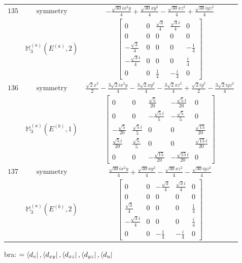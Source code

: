 \documentclass[fleqn,8pt,landscape]{jsarticle}
\begin{document}
\begin{longtable}{ccc}
$ 135 $ & $ \text{symmetry} $ & $ - \frac{\sqrt{30} i x^{2} y}{4} + \frac{\sqrt{30} x y^{2}}{4} - \frac{\sqrt{30} x z^{2}}{4} + \frac{\sqrt{30} i y z^{2}}{4} $ \\
$  $ & $ \mathbb{M}_{3}^{(a)}(E^{(a)},2) $ & $ \begin{bmatrix} 0 & 0 & \frac{\sqrt{3}}{4} & \frac{\sqrt{3} i}{4} & 0 \\ 0 & 0 & 0 & 0 & 0 \\ - \frac{\sqrt{3}}{4} & 0 & 0 & 0 & - \frac{1}{4} \\ - \frac{\sqrt{3} i}{4} & 0 & 0 & 0 & \frac{i}{4} \\ 0 & 0 & \frac{1}{4} & - \frac{i}{4} & 0 \end{bmatrix} $ \\ \hline
$ 136 $ & $ \text{symmetry} $ & $ \frac{\sqrt{2} x^{3}}{2} - \frac{3 \sqrt{2} i x^{2} y}{4} - \frac{3 \sqrt{2} x y^{2}}{4} - \frac{3 \sqrt{2} x z^{2}}{4} + \frac{\sqrt{2} i y^{3}}{2} - \frac{3 \sqrt{2} i y z^{2}}{4} $ \\
$  $ & $ \mathbb{M}_{3}^{(a)}(E^{(b)},1) $ & $ \begin{bmatrix} 0 & 0 & \frac{\sqrt{5}}{20} & - \frac{\sqrt{5} i}{20} & 0 \\ 0 & 0 & - \frac{\sqrt{5} i}{5} & - \frac{\sqrt{5}}{5} & 0 \\ - \frac{\sqrt{5}}{20} & \frac{\sqrt{5} i}{5} & 0 & 0 & \frac{\sqrt{15}}{20} \\ \frac{\sqrt{5} i}{20} & \frac{\sqrt{5}}{5} & 0 & 0 & \frac{\sqrt{15} i}{20} \\ 0 & 0 & - \frac{\sqrt{15}}{20} & - \frac{\sqrt{15} i}{20} & 0 \end{bmatrix} $ \\ \hline
$ 137 $ & $ \text{symmetry} $ & $ \frac{\sqrt{30} i x^{2} y}{4} + \frac{\sqrt{30} x y^{2}}{4} - \frac{\sqrt{30} x z^{2}}{4} - \frac{\sqrt{30} i y z^{2}}{4} $ \\
$  $ & $ \mathbb{M}_{3}^{(a)}(E^{(b)},2) $ & $ \begin{bmatrix} 0 & 0 & - \frac{\sqrt{3}}{4} & \frac{\sqrt{3} i}{4} & 0 \\ 0 & 0 & 0 & 0 & 0 \\ \frac{\sqrt{3}}{4} & 0 & 0 & 0 & \frac{1}{4} \\ - \frac{\sqrt{3} i}{4} & 0 & 0 & 0 & \frac{i}{4} \\ 0 & 0 & - \frac{1}{4} & - \frac{i}{4} & 0 \end{bmatrix} $ \\ \hline
\end{longtable}
bra: $=\bra{d_{v}}, \bra{d_{xy}}, \bra{d_{xz}}, \bra{d_{yz}}, \bra{d_{u}}$
\end{document}
